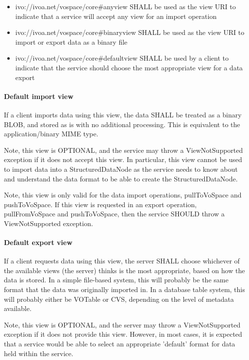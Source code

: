 \documentclass[11pt,a4paper]{ivoa}
\begin{document}
\begin{itemize}
    \item ivo://ivoa.net/vospace/core\#anyview SHALL be used as the view URI to indicate that a service will accept any view for an import operation
    \item ivo://ivoa.net/vospace/core\#binaryview SHALL be used as the view URI to import or export data as a binary file
    \item ivo://ivoa.net/vospace/core\#defaultview SHALL be used by a client to indicate that the service should choose the most appropriate view for a data export
\end{itemize}

\paragraph{Default import view}
If a client imports data using this view, the data SHALL be treated as a binary BLOB, and stored as is with no additional processing. This is equivalent to the application/binary MIME type.

Note, this view is OPTIONAL, and the service may throw a ViewNotSupported exception if it does not accept this view. In particular, this view cannot be used to import data into a StructuredDataNode as the service needs to know about and understand the data format to be able to create the StructuredDataNode.

Note, this view is only valid for the data import operations, pullToVoSpace and pushToVoSpace. If this view is requested in an export operation, pullFromVoSpace and pushToVoSpace, then the service SHOULD throw a ViewNotSupported exception.

\paragraph{Default export view}
If a client requests data using this view, the server SHALL choose whichever of the available views (the server) thinks is the most appropriate, based on how the data is stored. In a simple file-based system, this will probably be the same format that the data was originally imported in. In a database table system, this will probably either be VOTable or CVS, depending on the level of metadata available.

Note, this view is OPTIONAL, and the server may throw a ViewNotSupported exception if it does not provide this view. However, in most cases, it is expected that a service would be able to select an appropriate 'default' format for data held within the service.
\end{document}
